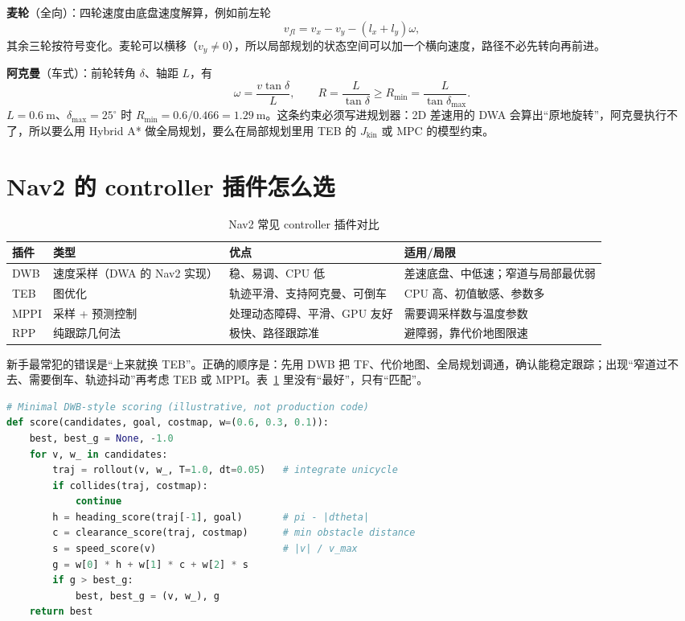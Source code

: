 \textbf{麦轮}（全向）：四轮速度由底盘速度解算，例如前左轮
\begin{equation}
  v_{fl}=v_x-v_y-(l_x+l_y)\omega,
\end{equation}
其余三轮按符号变化。麦轮可以横移（$v_y\neq0$），所以局部规划的状态空间可以加一个横向速度，路径不必先转向再前进。

\textbf{阿克曼}（车式）：前轮转角 $\delta$、轴距 $L$，有
\begin{equation}
  \omega=\frac{v\tan\delta}{L},\qquad R=\frac{L}{\tan\delta}\ge R_{\min}=\frac{L}{\tan\delta_{\max}}.
  \label{eq:20-ackermann}
\end{equation}
$L=0.6\ \mathrm{m}$、$\delta_{\max}=25^\circ$ 时 $R_{\min}=0.6/0.466=1.29\ \mathrm{m}$。这条约束必须写进规划器：2D 差速用的 DWA 会算出“原地旋转”，阿克曼执行不了，所以要么用 Hybrid A* 做全局规划，要么在局部规划里用 TEB 的 $J_{\mathrm{kin}}$ 或 MPC 的模型约束。

\section{Nav2 的 controller 插件怎么选}\label{sec:20-plugins}

\begin{table}[htbp]
  \centering
  \caption{Nav2 常见 controller 插件对比}
  \label{tab:20-controllers}
  \small
  \begin{tabular}{p{2.7cm}p{2.5cm}p{3.1cm}p{3.4cm}}
    \toprule
    插件 & 类型 & 优点 & 适用/局限 \\
    \midrule
    DWB & 速度采样（DWA 的 Nav2 实现） & 稳、易调、CPU 低 & 差速底盘、中低速；窄道与局部最优弱 \\
    TEB & 图优化 & 轨迹平滑、支持阿克曼、可倒车 & CPU 高、初值敏感、参数多 \\
    MPPI & 采样 + 预测控制 & 处理动态障碍、平滑、GPU 友好 & 需要调采样数与温度参数 \\
    RPP & 纯跟踪几何法 & 极快、路径跟踪准 & 避障弱，靠代价地图限速 \\
    \bottomrule
  \end{tabular}
\end{table}

新手最常犯的错误是“上来就换 TEB”。正确的顺序是：先用 DWB 把 TF、代价地图、全局规划调通，确认能稳定跟踪；出现“窄道过不去、需要倒车、轨迹抖动”再考虑 TEB 或 MPPI。表~\ref{tab:20-controllers} 里没有“最好”，只有“匹配”。

\begin{lstlisting}[language=Python]
# Minimal DWB-style scoring (illustrative, not production code)
def score(candidates, goal, costmap, w=(0.6, 0.3, 0.1)):
    best, best_g = None, -1.0
    for v, w_ in candidates:
        traj = rollout(v, w_, T=1.0, dt=0.05)   # integrate unicycle
        if collides(traj, costmap):
            continue
        h = heading_score(traj[-1], goal)       # pi - |dtheta|
        c = clearance_score(traj, costmap)      # min obstacle distance
        s = speed_score(v)                      # |v| / v_max
        g = w[0] * h + w[1] * c + w[2] * s
        if g > best_g:
            best, best_g = (v, w_), g
    return best
\end{lstlisting}

